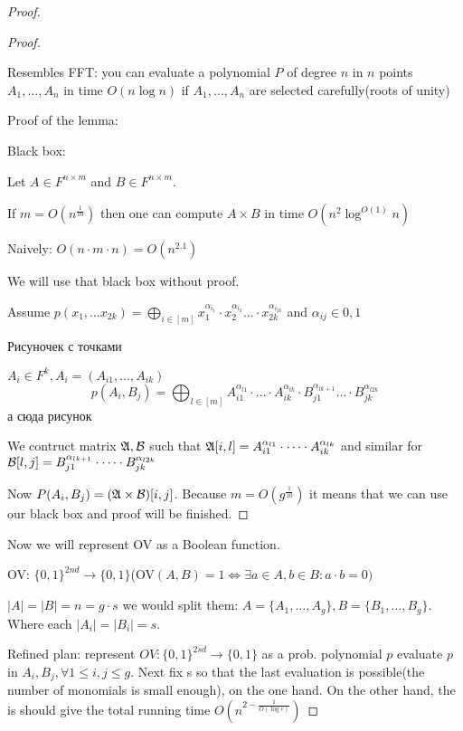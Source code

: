 \begin{proof}
\begin{proof}
		\begin{remrk*}
			Resembles FFT: you can evaluate a polynomial $P$ of degree $n$ in $n$ points $A_1, \dots, A_n$ in time $O(n \log n)$ if $A_1, \dots, A_n$ are selected carefully(roots of unity)
		\end{remrk*}

		Proof of the lemma:

		Black box:
		\begin{thm}[Coopersmith, 198?]
			Let $A \in F^{n \times m}$ and $B \in F^{n \times m}$.

			If $m = O(n^{\frac{1}{10}})$ then one can compute $A \times B$ in time $O(n^2 \log ^{O(1)} n)$

			Naively: $O(n \cdot m \cdot n) = O(n^{2.1})$
		\end{thm}

		We will use that black box without proof.

		Assume $p(x_1, \dots x_{2k}) = \bigoplus_{i \in [m]} x_1^{\alpha_{i_1}} \cdot x_2^{\alpha_{i_2}} \dots \cdot x_{2k}^{\alpha_{i_{2k}}}$ and $\alpha_{i j} \in {0, 1}$

		{\color{red} Рисуночек с точками}

		$A_i \in F^k, A_i = (A_{i 1}, \dots, A_{i k})$
		\[
			p(A_i, B_j) = \bigoplus_{l \in [m]} A_{i 1}^{\alpha_{l 1}} \cdot \dots \cdot A_{i k}^{\alpha_{l k}} \cdot B_{j 1}^{\alpha_{l k + 1} } \dots \cdot B_{j k}^{\alpha_{l 2k}}
		\]
		{\color{red} а сюда рисунок}

		We contruct matrix $\mathfrak{A}, \mathcal{B}$ such that $\mathfrak{A}[i, l] = A_{i 1}^{\alpha_{l 1}} \cdot \dots \cdot A_{i k}^{\alpha_{l k}}$ and similar for $\mathcal{B}[l, j] = B_{j 1}^{\alpha_{l k + 1}} \cdot \dots \cdot B_{j k}^{\alpha_{l 2k}}$

		Now $P(A_i, B_j) = (\mathfrak{A} \times \mathcal{B})[i, j]$. Because $m = O(g^{\frac{1}{10}})$ it means that we can use our black box and proof will be finished.
	\end{proof}

	Now we will represent OV as a Boolean function.

	OV: $\{0, 1\}^{2nd} \to \{0, 1\}$(OV$(A, B) = 1 \Leftrightarrow \exists a \in A, b \in B : a \cdot b = 0 )$

	$|A| = |B| = n = g \cdot s$ we would split them: $A = \{ A_1, \dots, A_g\}, B = \{B_1, \dots, B_g\}$.
	Where each $|A_i| = |B_i| = s$.

	Refined plan: represent $OV : \{0, 1\}^{2sd} \to \{0, 1\}$ as a prob. polynomial $p$  evaluate $p$ in $A_i, B_j, \forall 1 \leq i, j \leq g$.
	Next fix s so that the last evaluation is possible(the number of monomials is small enough), on the one hand. On the other hand, the is should give the total running time $O(n^{2 - \frac{1}{O(\log c)}})$


\end{proof}
